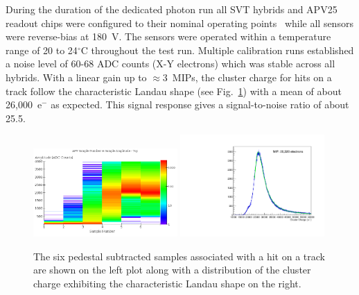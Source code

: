 During the duration of the dedicated photon run all SVT hybrids and APV25 
readout chips were configured to their nominal operating 
points~\cite{Jones:1069892} while all sensors were reverse-bias at 180~V.  The 
sensors were operated within a temperature range of  20 to 24$^\circ$C 
throughout the test run. Multiple calibration runs established a noise level of 60-68 
ADC counts (X-Y electrons) which was stable across all hybrids. With a linear gain up to $\approx 3$~MIPs, the 
cluster charge for hits on a track follow the characteristic Landau shape (see Fig.~\ref{fig:cluster_pulse}) with a 
mean of about 26,000~e$^{-}$ as expected. This signal response gives a signal-to-noise ratio of about 25.5. 
\begin{figure}[h]
	\includegraphics[width=0.49\textwidth]{test2012/svtperformance/svt_calib/08062012_run1351_samples_vs_amplitude.png}
	\includegraphics[width=0.49\textwidth]{test2012/svtperformance/svt_calib/run1351_mip_small.pdf}
    \caption{The six pedestal subtracted samples associated with a hit on a track 
             are shown on the left plot along with a distribution of the cluster
             charge exhibiting the characteristic Landau shape on the right. 
            }
	\label{fig:cluster_pulse}
\end{figure}


